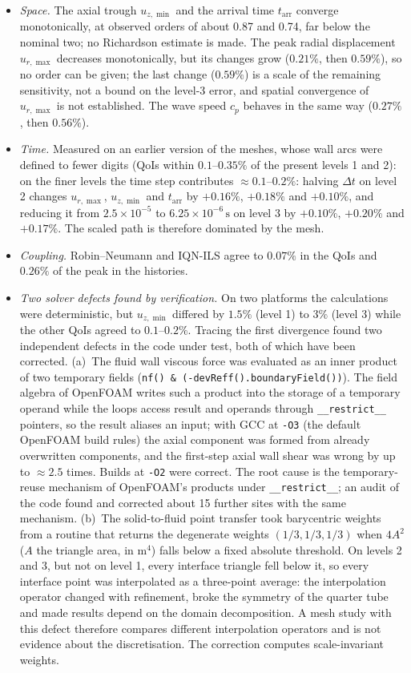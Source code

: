 \begin{itemize}
	\item \emph{Space.} The axial trough $u_{z,\min}$ and the arrival time $t_\mathrm{arr}$ converge monotonically, at observed orders of about 0.87 and 0.74, far below the nominal two; no Richardson estimate is made. The peak radial displacement $u_{r,\max}$ decreases monotonically, but its changes grow ($0.21\%$, then $0.59\%$), so no order can be given; the last change ($0.59\%$) is a scale of the remaining sensitivity, not a bound on the level-3 error, and spatial convergence of $u_{r,\max}$ is not established. The wave speed $c_p$ behaves in the same way ($0.27\%$, then $0.56\%$).
	\item \emph{Time.} Measured on an earlier version of the meshes, whose wall arcs were defined to fewer digits (QoIs within $0.1$--$0.35\%$ of the present levels 1 and 2): on the finer levels the time step contributes $\approx0.1$--$0.2\%$: halving $\Delta t$ on level 2 changes $u_{r,\max}$, $u_{z,\min}$ and $t_\mathrm{arr}$ by $+0.16\%$, $+0.18\%$ and $+0.10\%$, and reducing it from $2.5\times10^{-5}$ to $6.25\times10^{-6}\,\mathrm{s}$ on level 3 by $+0.10\%$, $+0.20\%$ and $+0.17\%$. The scaled path is therefore dominated by the mesh.
	\item \emph{Coupling.} Robin--Neumann and IQN-ILS agree to $0.07\%$ in the QoIs and $0.26\%$ of the peak in the histories.
	\item \emph{Two solver defects found by verification.} On two platforms the calculations were deterministic, but $u_{z,\min}$ differed by $1.5\%$ (level 1) to $3\%$ (level 3) while the other QoIs agreed to $0.1$--$0.2\%$. Tracing the first divergence found two independent defects in the code under test, both of which have been corrected.
	(a)~The fluid wall viscous force was evaluated as an inner product of two temporary fields (\texttt{nf() \& (-devReff().boundaryField())}). The field algebra of OpenFOAM writes such a product into the storage of a temporary operand while the loops access result and operands through \texttt{\_\_restrict\_\_} pointers, so the result aliases an input; with GCC at \texttt{-O3} (the default OpenFOAM build rules) the axial component was formed from already overwritten components, and the first-step axial wall shear was wrong by up to $\approx2.5$ times. Builds at \texttt{-O2} were correct. The root cause is the temporary-reuse mechanism of OpenFOAM's products under \texttt{\_\_restrict\_\_}; an audit of the code found and corrected about 15 further sites with the same mechanism.
	(b)~The solid-to-fluid point transfer took barycentric weights from a routine that returns the degenerate weights $(1/3, 1/3, 1/3)$ when $4A^2$ ($A$ the triangle area, in $\mathrm{m}^4$) falls below a fixed absolute threshold. On levels 2 and 3, but not on level 1, every interface triangle fell below it, so every interface point was interpolated as a three-point average: the interpolation operator changed with refinement, broke the symmetry of the quarter tube and made results depend on the domain decomposition. A mesh study with this defect therefore compares different interpolation operators and is not evidence about the discretisation. The correction computes scale-invariant weights.

\end{itemize}

